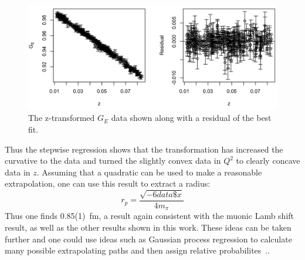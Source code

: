 \documentclass[10pt,aps,prc,twocolumn]{revtex4-1}
\begin{document}
\begin{appendix}
\begin{Verbatim}[fontsize=\footnotesize]
\end{Verbatim}

\begin{figure}[htb]
\includegraphics[width=\columnwidth]{Figure/ztransform-R-fit.png}
\caption{The z-transformed $G_E$ data shown along with a residual of the best fit.}
\end{figure}

Thus the stepwise regression shows that the transformation
has increased the curvative to the data and turned the slightly
convex data in $Q^2$ to clearly concave data in $z$.
Assuming that a quadratic can be used to make a reasonable extrapolation, one can
use this result to extract a radius:
\begin{equation}
r_p = \frac{\sqrt{-6data\$x}}{4 m_{\pi}}
\end{equation}
Thus one finds 0.85(1)~fm,  a result again consistent with the muonic Lamb shift result,
as well as the other results shown in this work.
These ideas can be taken further and one could use ideas such as Gaussian process 
regression to calculate many possible extrapolating paths and then assign relative 
probabilites~\cite{Rasmussen:2005}..    

\end{appendix}


\end{document}
